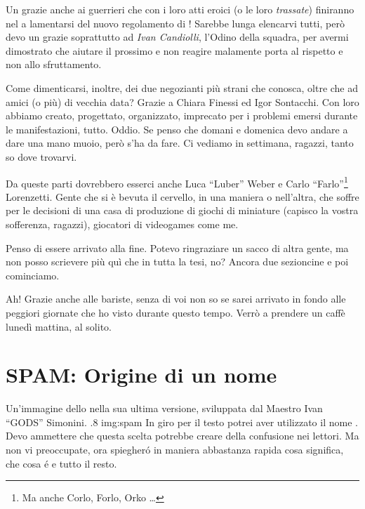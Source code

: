 Un grazie anche ai guerrieri che con i loro atti eroici (o le loro
\emph{trassate}) finiranno nel  a lamentarsi del nuovo
regolamento di ! Sarebbe lunga elencarvi tutti,
però devo un grazie soprattutto ad \emph{Ivan Candiolli}, l'Odino della
squadra, per avermi dimostrato che aiutare il prossimo e non reagire
malamente porta al rispetto e non allo sfruttamento.

Come dimenticarsi, inoltre, dei due negozianti più strani che conosca,
oltre che ad amici (o più) di vecchia data? Grazie a Chiara Finessi ed Igor
Sontacchi. Con loro abbiamo creato, progettato, organizzato, imprecato per
i problemi emersi durante le manifestazioni, tutto. Oddio. Se penso che
domani e domenica devo andare a dare una mano muoio, però s'ha da fare. Ci
vediamo in settimana, ragazzi, tanto so dove trovarvi.

Da queste parti dovrebbero esserci anche Luca ``Luber'' Weber e Carlo
``Farlo''\footnote{Ma anche Corlo, Forlo, Orko \dots{}} Lorenzetti. Gente
che si è bevuta il cervello, in una maniera o nell'altra, che soffre per le
decisioni di una casa di produzione di giochi di miniature (capisco la
vostra sofferenza, ragazzi), giocatori di videogames come me.

Penso di essere arrivato alla fine. Potevo ringraziare un sacco di altra
gente, ma non posso scrievere più quì che in tutta la tesi, no? Ancora due
sezioncine e poi cominciamo.

Ah! Grazie anche alle bariste, senza di voi non so se sarei arrivato in
fondo alle peggiori giornate che ho visto durante questo tempo. Verrò a
prendere un caffè lunedì mattina, al solito.

\section*{SPAM: Origine di un nome}
        {Un'immagine dello \SPAM{} nella sua ultima versione,
            sviluppata dal Maestro Ivan ``GODS'' Simonini.}
        {.8}
        {img:spam}
In giro per il testo potrei aver utilizzato il nome \SPAM{}. Devo ammettere
che questa scelta potrebbe creare della confusione nei lettori. Ma non vi
preoccupate, ora spiegher\'o in maniera abbastanza rapida cosa significa,
che cosa \'e e tutto il resto.

\cleardoublepage

